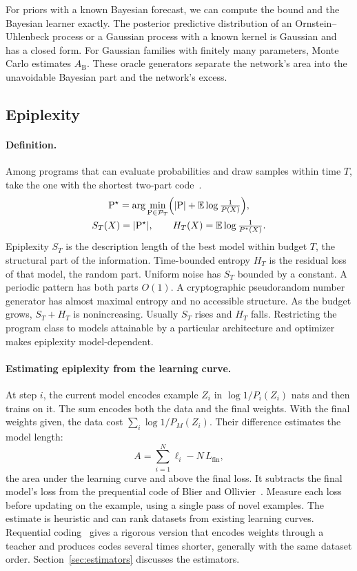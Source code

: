 \documentclass[11pt]{article}
\newcommand{\Lfin}{L_{\mathrm{fin}}}
\begin{document}
For priors with a known Bayesian forecast, we can compute the bound and the
Bayesian learner exactly. The posterior predictive distribution of an
Ornstein--Uhlenbeck process or a Gaussian process with a known kernel is Gaussian
and has a closed form. For Gaussian families with finitely many parameters,
Monte Carlo estimates $A_{\mathrm{B}}$. These oracle generators separate the
network's area into the unavoidable Bayesian part and the network's excess.

\subsection{Epiplexity}

\paragraph{Definition.} Among programs that can evaluate probabilities and draw
samples within time $T$, take the one with the shortest two-part
code~\citep{finzi2026}.
\[
\begin{gathered}
\mathrm{P}^\star=\arg\min_{\mathrm{P}\in\mathcal{P}_T}\Bigl(|\mathrm{P}|+\mathbb{E}\log\tfrac{1}{P(X)}\Bigr),\\
S_T(X)=|\mathrm{P}^\star|,\qquad H_T(X)=\mathbb{E}\log\tfrac{1}{P^\star(X)}.
\end{gathered}
\]
Epiplexity $S_T$ is the description length of the best model within budget $T$, the
structural part of the information. Time-bounded entropy $H_T$ is the residual loss
of that model, the random part. Uniform noise has $S_T$ bounded by a constant. A
periodic pattern has both parts $O(1)$. A cryptographic pseudorandom number generator
has almost maximal entropy and no accessible structure. As the budget grows,
$S_T+H_T$ is nonincreasing. Usually $S_T$ rises and $H_T$ falls. Restricting the
program class to models attainable by a particular architecture and optimizer
makes epiplexity model-dependent.

\paragraph{Estimating epiplexity from the learning curve.} At step $i$, the
current model encodes example $Z_i$ in $\log 1/P_i(Z_i)$ nats and then trains on it.
The sum encodes both the data and the final weights. With the final weights given,
the data cost $\sum_i\log 1/P_M(Z_i)$. Their difference estimates the model length:
\[
A=\sum_{i=1}^{N}\ell_i-N\,\Lfin,
\]
the area under the learning curve and above the final loss. It subtracts the final
model's loss from the prequential code of Blier and Ollivier~\citep{blier2018}.
Measure each loss before updating on the example, using a single pass of novel
examples. The estimate is heuristic and can rank datasets from existing learning
curves. Requential coding~\citep{qiu2026} gives a rigorous version that encodes
weights through a teacher and produces codes several times shorter, generally with
the same dataset order. Section~\ref{sec:estimators} discusses the estimators.
\end{document}
